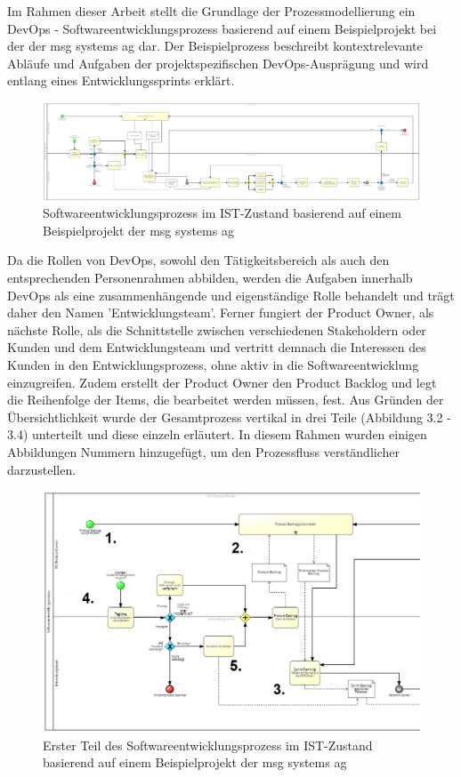 Im Rahmen dieser Arbeit stellt die Grundlage der Prozessmodellierung ein DevOps - Softwareentwicklungsprozess basierend auf einem Beispielprojekt bei der der msg systems ag dar. Der Beispielprozess beschreibt kontextrelevante Abläufe und Aufgaben der projektspezifischen DevOps-Ausprägung und wird entlang eines Entwicklungssprints erklärt. \\ 

\begin{figure}[p]
    \centering
    \includegraphics[angle=90, scale=0.5]{Bilder/IST-Prozess_neu.png}
    \caption{Softwareentwicklungsprozess im IST-Zustand basierend auf einem Beispielprojekt der msg systems ag}
\end{figure} 

\newpage
Da die Rollen von DevOps, sowohl den Tätigkeitsbereich als auch den entsprechenden Personenrahmen abbilden, werden die Aufgaben innerhalb DevOps als eine zusammenhängende und eigenständige Rolle behandelt und trägt daher den Namen 'Entwicklungsteam'. Ferner fungiert der Product Owner, als nächste Rolle, als die Schnittstelle zwischen verschiedenen Stakeholdern oder Kunden und dem Entwicklungsteam und vertritt demnach die Interessen des Kunden in den Entwicklungsprozess, ohne aktiv in die Softwareentwicklung einzugreifen. Zudem erstellt der Product Owner den Product Backlog und legt die Reihenfolge der Items, die bearbeitet werden müssen, fest. Aus Gründen der Übersichtlichkeit wurde der Gesamtprozess vertikal in drei Teile (Abbildung 3.2 - 3.4) unterteilt und diese einzeln erläutert. In diesem Rahmen wurden einigen Abbildungen Nummern hinzugefügt, um den Prozessfluss verständlicher darzustellen.  

\begin{figure}[h]
    \centering
    \includegraphics[scale=0.5]{Bilder/IST-Prozess_first Partv2.png}
    \caption{Erster Teil des Softwareentwicklungsprozess im IST-Zustand basierend auf einem Beispielprojekt der msg systems ag}
\end{figure}

